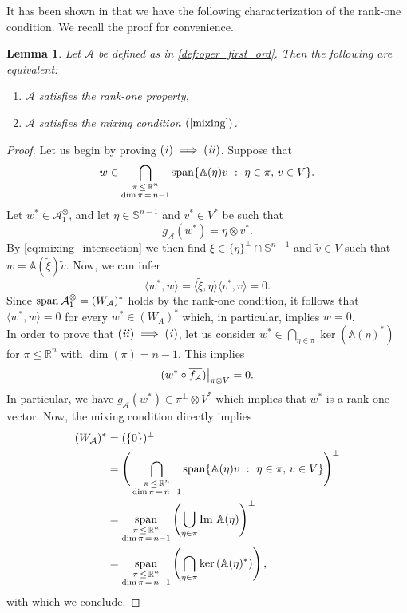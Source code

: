 \documentclass[11pt,reqno]{amsart}
\theoremstyle{plain}
\newtheorem{lemma}[theorem]{Lemma}
\theoremstyle{definition}
\theoremstyle{remark}
\numberwithin{equation}{section}
\newcommand{\R}{\mathbb{R}}
\newcommand{\s}{\mathbb{S}}
\newcommand{\A}{\mathcal{A}}
\renewcommand{\AA}{\mathbb{A}}
\newcommand{\1}{\mathbbm{1}} %
\newcommand{\Span}{\textnormal{span}}
\newcommand{\st}{\ : \ }
\newcommand{\Ima}{\textnormal{Im }}
\newcommand\restr[2]{{%
\left.\kern-\nulldelimiterspace %
#1 %
\vphantom{\big|} %
\right|_{#2} %
}}
\begin{document}
It has been shown in \cite[Lemma 4.1]{AR20} that we have the following characterization of the rank-one condition. We recall the proof for convenience.

\begin{lemma}
    Let $\A$ be defined as in \eqref{def:oper_first_ord}. Then the following are equivalent: 
    \begin{enumerate}
        \item[(i)] $\A$ satisfies the rank-one property,
        \item[(ii)] $\A$ satisfies the mixing condition $(\ref{mixing})$.
    \end{enumerate}
\end{lemma}
\begin{proof}
    Let us begin by proving ${\it (i)} \implies {\it (ii)}$. Suppose that 
    \begin{equation}
    \label{eq:mixing_intersection}
        w \in \bigcap_{\substack{\pi \, \leq\,  \R^n \\  \dim{\pi}\, =\, n-1}} \Span \{ \AA(\eta)v \st \eta \in \pi, \, v \in V \}.
    \end{equation}
    Let $w^* \in \A_1^\otimes$, and let $\eta \in \s^{n-1}$ and $v^* \in V^*$ be such that
    \[
        g_\A(w^*) = \eta \otimes v^*.
    \]
    By \eqref{eq:mixing_intersection} we then find $\tilde \xi \in \{\eta\}^\perp \cap \s^{n-1}$ and $\tilde v \in V$ such that $w = \AA(\tilde \xi) \tilde v$. Now, we can infer
    \[
        \langle w^*, w \rangle = \langle \tilde \xi, \eta\rangle \langle v^*, v \rangle = 0.
    \]
    Since $\Span\, \A_1^\otimes = (W_\A)^*$ holds by the rank-one condition, it follows that $\langle w^*, w \rangle = 0$ for every $w^* \in (W_A)^*$ which, in particular, implies $w = 0$.
    \\
    In order to prove that ${\it (ii)} \implies {\it (i)}$, let us consider $w^* \in \bigcap_{\eta \in \pi} \ker(\AA(\eta)^*)$ for $\pi \leq \R^n$ with $\dim(\pi) = n - 1$. This implies
    \[
        \restr{(w^* \circ \overline{f_\A})}{\pi \otimes V} = 0.
    \]
    In particular, we have $g_\A(w^*) \in \pi^\perp \otimes V^*$ which implies that $w^*$ is a rank-one vector. Now, the mixing condition directly implies
    \begin{equation*}
    \begin{aligned}
        (W_\A)^*
        &= (\{0\})^\perp \\
        &= \Bigg(\bigcap_{\substack{\pi \, \leq\,  \R^n \\  \dim{\pi}\, =\, n-1}} \Span\{ \AA(\eta)v \st \eta \in \pi, \, v \in V \} \Bigg)^\perp \\
        &= \underset{\substack{\pi \, \leq\,  \R^n \\  \dim{\pi}\, =\, n-1}}{\Span} \left( \bigcup_{\eta \in \pi} \Ima \AA(\eta) \right)^\perp \\
        &= \underset{\substack{\pi \, \leq\,  \R^n \\  \dim{\pi}\, =\, n-1}}{\Span} \left( \bigcap_{\eta \in \pi} \ker \left( \AA(\eta)^* \right) \right),
    \end{aligned}
    \end{equation*}
    with which we conclude.
\end{proof}
\end{document}
